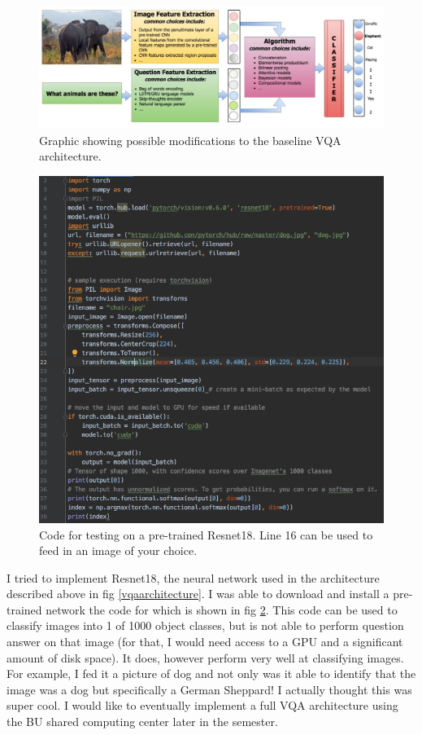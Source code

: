 \documentclass[manuscript,11pt]{article}
\begin{document}
\begin{figure}[h]
\centering
\includegraphics[scale=.3]{VQAapproaches}
\caption{Graphic showing possible modifications to the baseline VQA architecture.}
\label{VQAapproaches}
\end{figure} 

\begin{figure}
\centering
\includegraphics[scale=.35]{code}
\caption{Code for testing on a pre-trained Resnet18. Line 16 can be used to feed in an image of your choice.}
\label{code}
\end{figure} 

I tried to implement Resnet18, the neural network used in the architecture described above in fig \ref{vqaarchitecture}. I was able to download and install a pre-trained network the code for which is shown in fig \ref{code}. This code can be used to classify images into 1 of 1000 object classes, but is not able to perform question answer on that image (for that, I would need access to a GPU and a significant amount of disk space). It does, however perform very well at classifying images. For example, I fed it a picture of dog and not only was it able to identify that the image was a dog but specifically a German Sheppard! I actually thought this was super cool. I would like to eventually implement a full VQA architecture using the BU shared computing center later in the semester.
\end{document}
